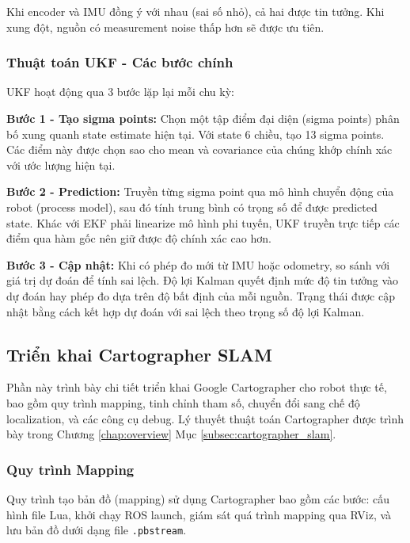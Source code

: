 Khi encoder và IMU đồng ý với nhau (sai số nhỏ), cả hai được tin tưởng. Khi xung đột, nguồn có measurement noise thấp hơn sẽ được ưu tiên.

\subsubsection{Thuật toán UKF - Các bước chính}

UKF hoạt động qua 3 bước lặp lại mỗi chu kỳ:

\textbf{Bước 1 - Tạo sigma points:} Chọn một tập điểm đại diện (sigma points) phân bố xung quanh state estimate hiện tại. Với state 6 chiều, tạo 13 sigma points. Các điểm này được chọn sao cho mean và covariance của chúng khớp chính xác với ước lượng hiện tại.

\textbf{Bước 2 - Prediction:} Truyền từng sigma point qua mô hình chuyển động của robot (process model), sau đó tính trung bình có trọng số để được predicted state. Khác với EKF phải linearize mô hình phi tuyến, UKF truyền trực tiếp các điểm qua hàm gốc nên giữ được độ chính xác cao hơn.

\textbf{Bước 3 - Cập nhật:} Khi có phép đo mới từ IMU hoặc odometry, so sánh với giá trị dự đoán để tính sai lệch. Độ lợi Kalman quyết định mức độ tin tưởng vào dự đoán hay phép đo dựa trên độ bất định của mỗi nguồn. Trạng thái được cập nhật bằng cách kết hợp dự đoán với sai lệch theo trọng số độ lợi Kalman.

\subsection{Triển khai Cartographer SLAM}
\label{sec:cartographer_implementation}

Phần này trình bày chi tiết triển khai Google Cartographer cho robot thực tế, bao gồm quy trình mapping, tinh chỉnh tham số, chuyển đổi sang chế độ localization, và các công cụ debug. Lý thuyết thuật toán Cartographer được trình bày trong Chương \ref{chap:overview} Mục \ref{subsec:cartographer_slam}.

\subsubsection{Quy trình Mapping}
\label{subsec:mapping_workflow}

Quy trình tạo bản đồ (mapping) sử dụng Cartographer bao gồm các bước: cấu hình file Lua, khởi chạy ROS launch, giám sát quá trình mapping qua RViz, và lưu bản đồ dưới dạng file \texttt{.pbstream}.

